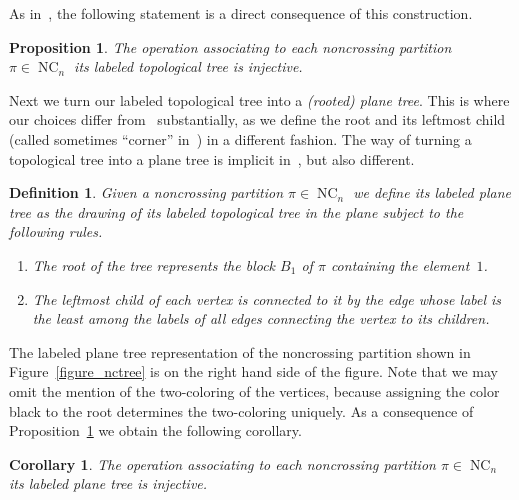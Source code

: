 \documentclass[11pt]{amsart}
\newtheorem{proposition}[theorem]{Proposition}
\newtheorem{definition}[theorem]{Definition}
\newtheorem{corollary}[theorem]{Corollary}
\numberwithin{equation}{section}
\DeclareMathOperator{\NC}{NC}
\begin{document}
As in~\cite[Section~2]{Kortchemski_Marzouk}, the following statement is
a direct consequence of this construction.
\begin{proposition}
\label{proposition_injective1}  
The operation associating to each noncrossing partition $\pi\in\NC_{n}$ its labeled topological tree is injective.
\end{proposition}  

Next we turn our labeled topological tree into a {\em (rooted) plane
  tree}. This is where our choices differ
from~\cite[Section~2]{Kortchemski_Marzouk} substantially, as we define
the root and its leftmost child (called sometimes ``corner''
in~\cite[Section~2]{Kortchemski_Marzouk}) in a different
fashion. The way of turning a topological tree into a plane tree is
implicit in~\cite{Muhle_Nadeau_Williams}, but also different. 

\begin{definition}
\label{definition_planetree}  
Given a noncrossing partition $\pi\in\NC_{n}$ we define its {\em labeled
  plane tree} as the drawing of its labeled topological tree in the
plane subject to the following rules.  
\begin{enumerate}
\item The root of the tree represents the block $B_{1}$ of $\pi$ containing the element~$1$.
\item The leftmost child of each vertex is connected to it by the edge whose
  label is the least among the labels of all edges connecting the vertex
  to its children.  
\end{enumerate}  
\end{definition} 
The labeled plane tree representation of the noncrossing partition shown
in Figure~\ref{figure_nctree} is on the right hand side of the figure.
Note that we may omit the mention of the
two-coloring of the vertices, because assigning the color black to the root
determines the two-coloring uniquely.
As a consequence of Proposition~\ref{proposition_injective1}
we obtain the following corollary.
\begin{corollary}
  \label{corollary_injective2}
The operation associating to each noncrossing partition $\pi\in\NC_{n}$
its labeled plane tree is injective.
\end{corollary}  
\end{document}
